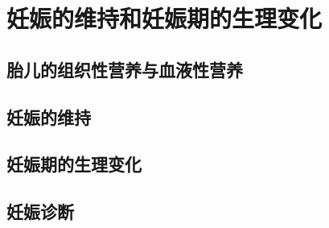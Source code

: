 \chapter{妊娠的维持和妊娠期的生理变化}

\section{胎儿的组织性营养与血液性营养}

\section{妊娠的维持}

\section{妊娠期的生理变化}

\section{妊娠诊断}